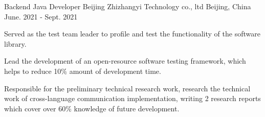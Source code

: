 \begin{cventries}
  \cventry
    {Backend Java Developer} %
    {Beijing Zhizhangyi Technology co., ltd} %
    {Beijing, China} %
    {June. 2021 - Sept. 2021} %
    {
      \begin{cvitems} %
        \item {Served as the test team leader to profile and test the functionality of the software library.}
        \item {Lead the development of an open-resource software testing framework, which helps to reduce 10\% amount of development time.}
        \item {Responsible for the preliminary technical research work, research the technical work of cross-language communication implementation, writing 2 research reports which cover over 60\% knowledge of future development.}
      \end{cvitems}
    }




\end{cventries}

